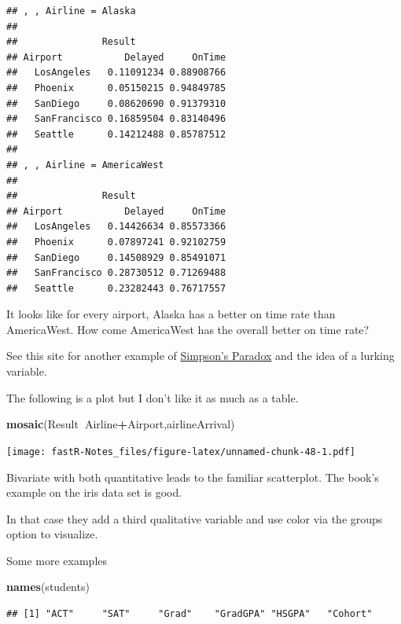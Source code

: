 \documentclass[]{book}
\newenvironment{Shaded}{\begin{snugshade}}{\end{snugshade}}
\newcommand{\KeywordTok}[1]{\textcolor[rgb]{0.13,0.29,0.53}{\textbf{#1}}}
\newcommand{\OperatorTok}[1]{\textcolor[rgb]{0.81,0.36,0.00}{\textbf{#1}}}
\newcommand{\NormalTok}[1]{#1}
\theoremstyle{definition}
\theoremstyle{definition}
\theoremstyle{definition}
\theoremstyle{remark}
\begin{document}
\begin{verbatim}
## , , Airline = Alaska
## 
##               Result
## Airport           Delayed     OnTime
##   LosAngeles   0.11091234 0.88908766
##   Phoenix      0.05150215 0.94849785
##   SanDiego     0.08620690 0.91379310
##   SanFrancisco 0.16859504 0.83140496
##   Seattle      0.14212488 0.85787512
## 
## , , Airline = AmericaWest
## 
##               Result
## Airport           Delayed     OnTime
##   LosAngeles   0.14426634 0.85573366
##   Phoenix      0.07897241 0.92102759
##   SanDiego     0.14508929 0.85491071
##   SanFrancisco 0.28730512 0.71269488
##   Seattle      0.23282443 0.76717557
\end{verbatim}

It looks like for every airport, Alaska has a better on time rate than
AmericaWest. How come AmericaWest has the overall better on time rate?

See this site for another example of
\href{http://vudlab.com/simpsons/}{Simpson's Paradox} and the idea of a
lurking variable.

The following is a plot but I don't like it as much as a table.

\begin{Shaded}
\begin{Highlighting}[]
\KeywordTok{mosaic}\NormalTok{(Result}\OperatorTok{~}\NormalTok{Airline}\OperatorTok{+}\NormalTok{Airport,airlineArrival)}
\end{Highlighting}
\end{Shaded}

\texttt{[image: fastR-Notes\_files/figure-latex/unnamed-chunk-48-1.pdf]}

Bivariate with both quantitative leads to the familiar scatterplot. The
book's example on the iris data set is good.

In that case they add a third qualitative variable and use color via the
groups option to visualize.

Some more examples

\begin{Shaded}
\begin{Highlighting}[]
\KeywordTok{names}\NormalTok{(students)}
\end{Highlighting}
\end{Shaded}

\begin{verbatim}
## [1] "ACT"     "SAT"     "Grad"    "GradGPA" "HSGPA"   "Cohort"
\end{verbatim}
\end{document}
